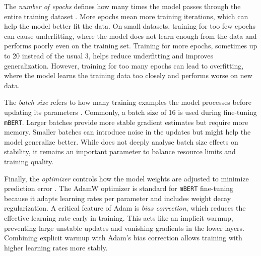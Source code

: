     The \textit{number of epochs} defines how many times the model passes through the entire training dataset \parencite{mosbachStabilityFinetuningBERT2021}. More epochs mean more training iterations, which can help the model better fit the data. On small datasets, training for too few epochs can cause underfitting, where the model does not learn enough from the data and performs poorly even on the training set. Training for more epochs, sometimes up to 20 instead of the usual 3, helps reduce underfitting and improves generalization. However, training for too many epochs can lead to overfitting, where the model learns the training data too closely and performs worse on new data.

    The \textit{batch size} refers to how many training examples the model processes before updating its parameters \parencite{mosbachStabilityFinetuningBERT2021}. Commonly, a batch size of 16 is used during fine-tuning \texttt{mBERT}. Larger batches provide more stable gradient estimates but require more memory. Smaller batches can introduce noise in the updates but might help the model generalize better. While \textcite{mosbachStabilityFinetuningBERT2021} does not deeply analyse batch size effects on stability, it remains an important parameter to balance resource limits and training quality.

    Finally, the \textit{optimizer} controls how the model weights are adjusted to minimize prediction error \parencite{mosbachStabilityFinetuningBERT2021}. The AdamW optimizer is standard for \texttt{mBERT} fine-tuning because it adapts learning rates per parameter and includes weight decay regularization. A critical feature of Adam is \textit{bias correction}, which reduces the effective learning rate early in training. This acts like an implicit warmup, preventing large unstable updates and vanishing gradients in the lower layers. Combining explicit warmup with Adam’s bias correction allows training with higher learning rates more stably.

